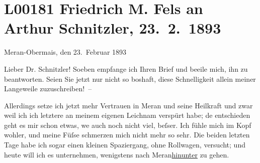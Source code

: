 

\section[Friedrich M. Fels an Arthur Schnitzler, 23. 2. 1893]{L00181 Friedrich M. Fels an Arthur Schnitzler, 23. 2. 1893}
\nopagebreak{}
\rehead{ }\normalsize\beginnumbering{}
\toendnotes[C]{\smallbreak\pagebreak[2]}
\toendnotes[C]{\smallbreak}
\toendnotes[C]{\smallbreak}
\pstart
           \raggedleft{}{\pb}Meran-Obermais, den 23. Februar 1893\pend
           
\pstart\center{}Lieber Dr. Schnitzler!\pend\vspace{0.5em}
\pstart
           Soeben empfange ich Ihren Brief und beeile mich, ihn zu beantworten. Seien Sie jetzt
               nur nicht so boshaft, diese Schnelligkeit allein meiner Langeweile
               zuzuschreiben! –\pend
           
\pstart
           Allerdings setze ich jetzt mehr Vertrauen in Meran und seine Heilkraft und zwar weil ich ich letztere an meinem eigenen
               Leichnam verspürt habe; de{\geminationn} entschieden geht es mir
               schon etwas, we{\geminationn} auch noch nicht viel, beſser. Ich fühle
               mich im Kopf wohler, und meine Füſse schmerzen mich nicht mehr so sehr. Die beiden
               letzten Tage habe ich sogar einen kleinen Spaziergang, ohne Rollwagen, versucht; und
               heute will ich es unternehmen, wenigstens nach Meran\uline{hinunter} zu gehen.\pend
           
